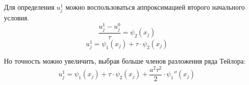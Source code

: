 \documentclass[a4paper, fontsize=14pt]{article}
\begin{document}
Для определения $u_j^1$ можно воспользоваться аппроксимацией второго начального условия.
\begin{equation}
  \frac{u_j^1 - u_j^0}{\tau} = \psi_2(x_j)
\end{equation}
\begin{equation}
  u_j^1 = \psi_1(x_j) + \tau \cdot \psi_2(x_j)
\end{equation}

Но точность можно увеличить, выбрав больше членов разложения ряда Тейлора:
  \begin{equation*}
    u_j^1 = \psi_1(x_j) + \tau \cdot \psi_2(x_j) + \frac{a^2 \tau^2}{2} \cdot \psi_1'' (x_j) 
  \end{equation*}


\end{document}
